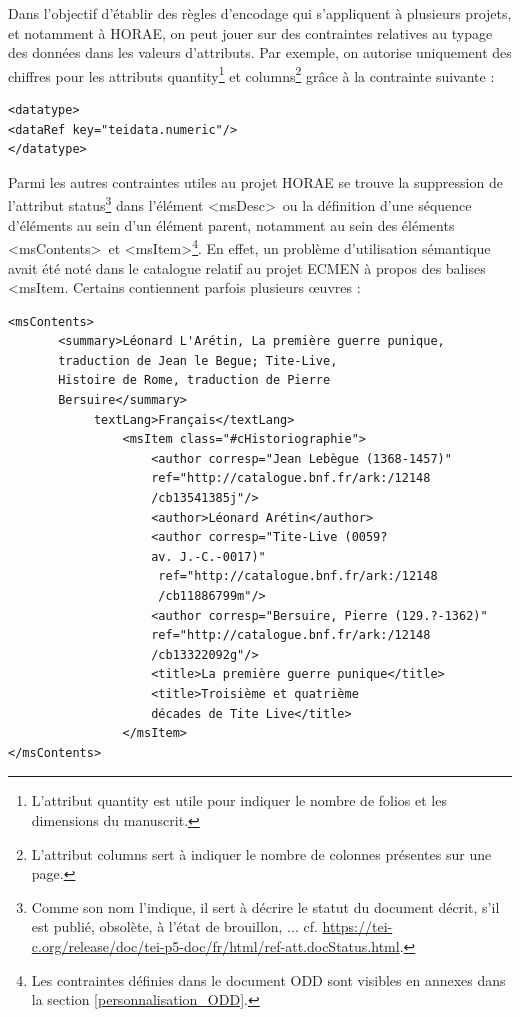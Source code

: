 \documentclass[a4paper,12pt,twoside]{book}
\begin{document}
	Dans l'objectif d'établir des règles d'encodage qui s'appliquent à plusieurs projets, et notamment à HORAE, on peut jouer sur des contraintes relatives au typage des données dans les valeurs d'attributs. Par exemple, on autorise uniquement des chiffres pour les attributs quantity\footnote{L'attribut quantity est utile pour indiquer le nombre de folios et les dimensions du manuscrit.} et columns\footnote{L'attribut columns sert à indiquer le nombre de colonnes présentes sur une page.} grâce à la contrainte suivante : 
	\begin{verbatim}
<datatype>
<dataRef key="teidata.numeric"/>
</datatype>
	\end{verbatim}
	Parmi les autres contraintes utiles au projet HORAE se trouve la suppression de l'attribut status\footnote{Comme son nom l'indique, il sert à décrire le statut du document décrit, s'il est publié, obsolète, à l'état de brouillon, ... cf. \url{https://tei-c.org/release/doc/tei-p5-doc/fr/html/ref-att.docStatus.html}.} dans l'élément \textless msDesc\textgreater~ou la définition d'une séquence d'éléments au sein d'un élément parent, notamment au sein des éléments \textless msContents\textgreater~et \textless msItem\textgreater \footnote{Les contraintes définies dans le document ODD sont visibles en annexes dans la section \ref{personnalisation_ODD}.}. En effet, un problème d'utilisation sémantique avait été noté dans le catalogue relatif au projet ECMEN à propos des balises \textless msItem\textgeater . Certains contiennent parfois plusieurs œuvres :
	\begin{verbatim}
<msContents>
       <summary>Léonard L'Arétin, La première guerre punique,
       traduction de Jean le Begue; Tite-Live, 
       Histoire de Rome, traduction de Pierre 
       Bersuire</summary>
            textLang>Français</textLang>
                <msItem class="#cHistoriographie">
                    <author corresp="Jean Lebègue (1368-1457)"
                    ref="http://catalogue.bnf.fr/ark:/12148
                    /cb13541385j"/>
                    <author>Léonard Arétin</author>
                    <author corresp="Tite-Live (0059? 
                    av. J.-C.-0017)"
                     ref="http://catalogue.bnf.fr/ark:/12148
                     /cb11886799m"/>
                    <author corresp="Bersuire, Pierre (129.?-1362)"
                    ref="http://catalogue.bnf.fr/ark:/12148
                    /cb13322092g"/>
                    <title>La première guerre punique</title>
                    <title>Troisième et quatrième 
                    décades de Tite Live</title>
                </msItem>
</msContents>
	\end{verbatim}
\end{document}
